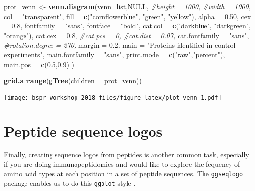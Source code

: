 \documentclass[12pt,]{book}
\newenvironment{Shaded}{\begin{snugshade}}{\end{snugshade}}
\newcommand{\KeywordTok}[1]{\textcolor[rgb]{0.13,0.29,0.53}{\textbf{#1}}}
\newcommand{\DataTypeTok}[1]{\textcolor[rgb]{0.13,0.29,0.53}{#1}}
\newcommand{\FloatTok}[1]{\textcolor[rgb]{0.00,0.00,0.81}{#1}}
\newcommand{\StringTok}[1]{\textcolor[rgb]{0.31,0.60,0.02}{#1}}
\newcommand{\CommentTok}[1]{\textcolor[rgb]{0.56,0.35,0.01}{\textit{#1}}}
\newcommand{\OtherTok}[1]{\textcolor[rgb]{0.56,0.35,0.01}{#1}}
\newcommand{\NormalTok}[1]{#1}
\theoremstyle{definition}
\theoremstyle{definition}
\theoremstyle{definition}
\theoremstyle{remark}
\begin{document}
\begin{Shaded}
\begin{Highlighting}[]
\NormalTok{prot_venn <-}\StringTok{ }\KeywordTok{venn.diagram}\NormalTok{(venn_list,}\OtherTok{NULL}\NormalTok{, }
               \CommentTok{#height = 1000,}
               \CommentTok{#width = 1000,}
               \DataTypeTok{col =} \StringTok{"transparent"}\NormalTok{,}
               \DataTypeTok{fill =} \KeywordTok{c}\NormalTok{(}\StringTok{"cornflowerblue"}\NormalTok{, }\StringTok{"green"}\NormalTok{, }\StringTok{"yellow"}\NormalTok{),}
               \DataTypeTok{alpha =} \FloatTok{0.50}\NormalTok{,}
               \DataTypeTok{cex =} \FloatTok{0.8}\NormalTok{,}
               \DataTypeTok{fontfamily =} \StringTok{"sans"}\NormalTok{,}
               \DataTypeTok{fontface =} \StringTok{"bold"}\NormalTok{,}
               \DataTypeTok{cat.col =} \KeywordTok{c}\NormalTok{(}\StringTok{"darkblue"}\NormalTok{, }\StringTok{"darkgreen"}\NormalTok{, }\StringTok{"orange"}\NormalTok{),}
               \DataTypeTok{cat.cex =} \FloatTok{0.8}\NormalTok{,}
               \CommentTok{#cat.pos = 0,}
               \CommentTok{#cat.dist = 0.07,}
               \DataTypeTok{cat.fontfamily =} \StringTok{"sans"}\NormalTok{,}
               \CommentTok{#rotation.degree = 270,}
               \DataTypeTok{margin =} \FloatTok{0.2}\NormalTok{,}
               \DataTypeTok{main =} \StringTok{"Proteins identified in control experiments"}\NormalTok{,}
               \DataTypeTok{main.fontfamily =} \StringTok{"sans"}\NormalTok{,}
               \DataTypeTok{print.mode =} \KeywordTok{c}\NormalTok{(}\StringTok{"raw"}\NormalTok{,}\StringTok{"percent"}\NormalTok{),}
               \DataTypeTok{main.pos =} \KeywordTok{c}\NormalTok{(}\FloatTok{0.5}\NormalTok{,}\FloatTok{0.9}\NormalTok{)}
\NormalTok{  )}

\KeywordTok{grid.arrange}\NormalTok{(}\KeywordTok{gTree}\NormalTok{(}\DataTypeTok{children =}\NormalTok{ prot_venn))}
\end{Highlighting}
\end{Shaded}

\texttt{[image: bspr-workshop-2018\_files/figure-latex/plot-venn-1.pdf]}

\section{Peptide sequence logos}\label{peptide-sequence-logos}

Finally, creating sequence logos from peptides is another common task,
especially if you are doing immunopeptidomics and would like to explore
the fequency of amino acid types at each position in a set of peptide
sequences. The \texttt{ggseqlogo} package enables us to do this
\texttt{ggplot} style \citep{R-ggseqlogo}.
\end{document}
